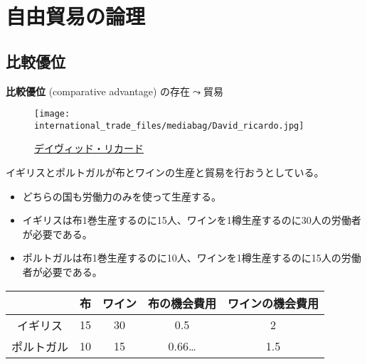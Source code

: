 \documentclass[
  xelatex,
  ja=standard]{bxjsarticle}
\providecommand{\tightlist}{%
  \setlength{\itemsep}{0pt}\setlength{\parskip}{0pt}}\usepackage{longtable,booktabs,array}
\begin{document}
\hypertarget{ux81eaux7531ux8cbfux6613ux306eux8ad6ux7406}{%
\section{自由貿易の論理}\label{ux81eaux7531ux8cbfux6613ux306eux8ad6ux7406}}

\hypertarget{ux6bd4ux8f03ux512aux4f4d}{%
\subsection{比較優位}\label{ux6bd4ux8f03ux512aux4f4d}}

\textbf{比較優位} (comparative advantage) の存在\(\leadsto\)貿易

\begin{figure}[htpb]

{\centering \texttt{[image: international\_trade\_files/mediabag/David\_ricardo.jpg]}

}

\caption{\href{https://commons.wikimedia.org/wiki/File:David_ricardo.jpg}{デイヴィッド・リカード}}

\end{figure}

\begin{tcolorbox}[enhanced jigsaw, coltitle=black, breakable, opacitybacktitle=0.6, left=2mm, titlerule=0mm, arc=.35mm, colbacktitle=quarto-callout-tip-color!10!white, opacityback=0, leftrule=.75mm, title=\textcolor{quarto-callout-tip-color}{\faLightbulb}\hspace{0.5em}{イギリスとポルトガルの貿易}, toptitle=1mm, bottomrule=.15mm, colframe=quarto-callout-tip-color-frame, toprule=.15mm, colback=white, rightrule=.15mm, bottomtitle=1mm]

イギリスとポルトガルが布とワインの生産と貿易を行おうとしている。

\begin{itemize}
\tightlist
\item
  どちらの国も労働力のみを使って生産する。
\item
  イギリスは布1巻生産するのに15人、ワインを1樽生産するのに30人の労働者が必要である。
\item
  ポルトガルは布1巻生産するのに10人、ワインを1樽生産するのに15人の労働者が必要である。
\end{itemize}

\end{tcolorbox}

\begin{longtable}[]{@{}ccccc@{}}
\toprule\noalign{}
& 布 & ワイン & 布の機会費用 & ワインの機会費用 \\
\midrule\noalign{}
\endhead
\bottomrule\noalign{}
\endlastfoot
イギリス & 15 & 30 & 0.5 & 2 \\
ポルトガル & 10 & 15 & 0.66\ldots{} & 1.5 \\
\end{longtable}
\end{document}

